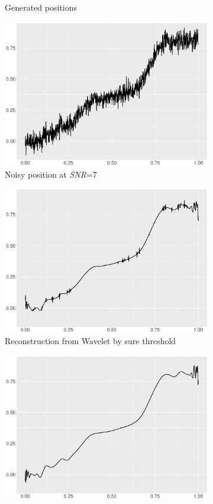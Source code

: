 \begin{figure}
\begin{subfigure}{0.45\textwidth}
    \caption{Generated positions}
    \end{subfigure}
    \begin{subfigure}{0.45\textwidth}
    \centering
    \includegraphics[width=\linewidth,height=0.45\textwidth]{Chapters/02TractorSplineTheory/plot/ggplot/ggBlocksPositionNoise.pdf}
    \caption{Noisy position at \textit{SNR}=7}
    \end{subfigure}
    \begin{subfigure}{0.45\textwidth}
    \centering
    \includegraphics[width=\linewidth,height=0.45\textwidth]{Chapters/02TractorSplineTheory/plot/ggplot/ggBlocksSure.pdf}
    \caption{Reconstruction from Wavelet by sure threshold}
    \end{subfigure}
    \begin{subfigure}{0.45\textwidth}
    \centering
    \includegraphics[width=\linewidth,height=0.45\textwidth]{Chapters/02TractorSplineTheory/plot/ggplot/ggBlocksBayes.pdf}

\end{subfigure}
\end{figure}
